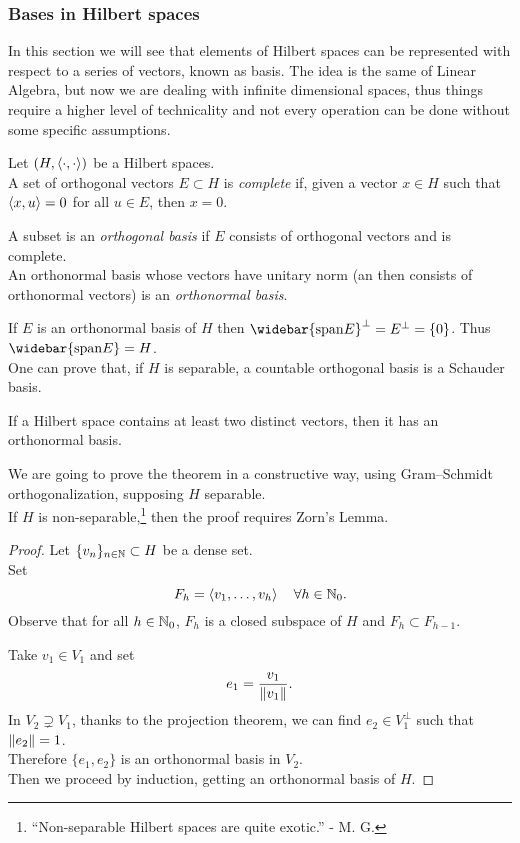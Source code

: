 \subsubsection{Bases in Hilbert spaces}
In this section we will see that elements of Hilbert spaces can be represented with respect to a series of vectors, known as basis. The idea is the same of Linear Algebra, but now we are dealing with infinite dimensional spaces, thus things require a higher level of technicality and not every operation can be done without some specific assumptions.

\begin{defn}
	Let $(H, \left\langle\cdot,\cdot\right\rangle)$ be a Hilbert spaces.\\
	A set of orthogonal vectors $E \subset H$ is \emph{complete} if, given a vector $x \in H$ such that $\left\langle x, u\right\rangle = 0$ for all $u \in E$, then $x = 0$.
	
	A subset is an \emph{orthogonal basis} if $E$ consists of orthogonal vectors and is complete.\\		
	An orthonormal basis whose vectors have unitary norm (an then consists of orthonormal vectors) is an \emph{orthonormal basis}.
\end{defn}


If $E$ is an orthonormal basis of $H$ then $\widebar{\mathrm{span}E}^\perp = E^\perp = \{0\}$. Thus $\widebar{\mathrm{span}E} = H$. \\
One can prove that, if $H$ is separable, a countable orthogonal basis is a Schauder basis.
\begin{theo}
	If a Hilbert space contains at least two distinct vectors, then it has an orthonormal basis.
\end{theo}
We are going to prove the theorem in a constructive way, using Gram--Schmidt orthogonalization, supposing $H$ separable.\\
If $H$ is non-separable,\footnote{``Non-separable Hilbert spaces are quite exotic.'' - M. G.} then the proof requires Zorn's Lemma.
\begin{proof} %
	Let $\{v_n\}_{n \in \mathbb N} \subset H$ be a dense set.\\
	Set 
	$$F_h = \left\langle v_1, \ldots, v_h\right\rangle \quad \forall h \in \mathbb N_0.$$
	Observe that for all $h \in \mathbb N_0$, $F_h$ is a closed subspace of $H$ and $F_h \subset F_{h-1}$.
	
	Take $v_1 \in V_1$ and set 
	$$e_1 = \frac{v_1}{\left\lVert v_1\right\rVert}.$$
	In $V_2 \supsetneq V_1$, thanks to the projection theorem, we can find $e_2 \in V_1^\perp$ such that $\left\lVert e_2\right\rVert = 1$.\\
	Therefore $\{e_1, e_2\}$ is an orthonormal basis in $V_2$.\\
	Then we proceed by induction, getting an orthonormal basis of $H$.
\end{proof}


